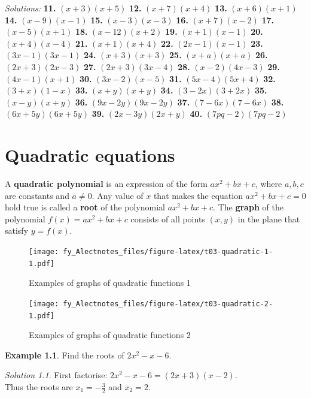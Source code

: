 \documentclass[
  12pt,
  oneside]{book}
\theoremstyle{definition}
\theoremstyle{definition}
\newtheorem{example}{Example}[chapter]
\theoremstyle{definition}
\theoremstyle{definition}
\theoremstyle{remark}
\newtheorem*{solution}{Solution}
\begin{document}
\emph{Solutions:}
\textbf{11.} \((x+3)(x+5)\)
\textbf{12.} \((x+7)(x+4)\)
\textbf{13.} \((x+6)(x+1)\)
\textbf{14.} \((x-9)(x-1)\)
\textbf{15.} \((x-3)(x-3)\)
\textbf{16.} \((x+7)(x-2)\)
\textbf{17.} \((x-5)(x+1)\)
\textbf{18.} \((x-12)(x+2)\)
\textbf{19.} \((x+1)(x-1)\)
\textbf{20.} \((x+4)(x-4)\)
\textbf{21.} \((x+1)(x+4)\)
\textbf{22.} \((2x-1)(x-1)\)
\textbf{23.} \((3x-1)(3x-1)\)
\textbf{24.} \((x+3)(x+3)\)
\textbf{25.} \((x+a)(x+a)\)
\textbf{26.} \((2x+3)(2x-3)\)
\textbf{27.} \((2x+3)(3x-4)\)
\textbf{28.} \((x-2)(4x-3)\)
\textbf{29.} \((4x-1)(x+1)\)
\textbf{30.} \((3x-2)(x-5)\)
\textbf{31.} \((5x-4)(5x+4)\)
\textbf{32.} \((3+x)(1-x)\)
\textbf{33.} \((x+y)(x+y)\)
\textbf{34.} \((3-2x)(3+2x)\)
\textbf{35.} \((x-y)(x+y)\)
\textbf{36.} \((9x-2y)(9x-2y)\)
\textbf{37.} \((7-6x)(7-6x)\)
\textbf{38.} \((6x+5y)(6x+5y)\)
\textbf{39.} \((2x-3y)(2x+y)\)
\textbf{40.} \((7pq-2)(7pq-2)\)

\hypertarget{quadratic-equations}{%
\chapter{Quadratic equations}\label{quadratic-equations}}

A \textbf{quadratic polynomial} is an expression of the form \(ax^2+bx+c\), where \(a,b,c\) are constants and \(a\neq0\).
Any value of \(x\) that makes the equation \(ax^2+bx+c=0\) hold true is called a \textbf{root} of the polynomial \(ax^2+bx+c\). The \textbf{graph} of the polynomial \(f(x)=ax^2+bx+c\) consists of all points \((x,y)\) in the plane that satisfy \(y=f(x)\).

\begin{figure}
\centering
\texttt{[image: fy\_Alectnotes\_files/figure-latex/t03-quadratic-1-1.pdf]}
\caption{\label{fig:t03-quadratic-1}Examples of graphs of quadratic functions 1}
\end{figure}

\begin{figure}
\centering
\texttt{[image: fy\_Alectnotes\_files/figure-latex/t03-quadratic-2-1.pdf]}
\caption{\label{fig:t03-quadratic-2}Examples of graphs of quadratic functions 2}
\end{figure}

\begin{example}
Find the roots of \(2x^2-x-6\).
\end{example}

\begin{solution}
First factorise: \(2x^2-x-6 = (2x+3)(x-2)\).\\
Thus the roots are \(x_1=-\frac{3}{2}\) and \(x_2=2\).
\end{solution}
\end{document}
